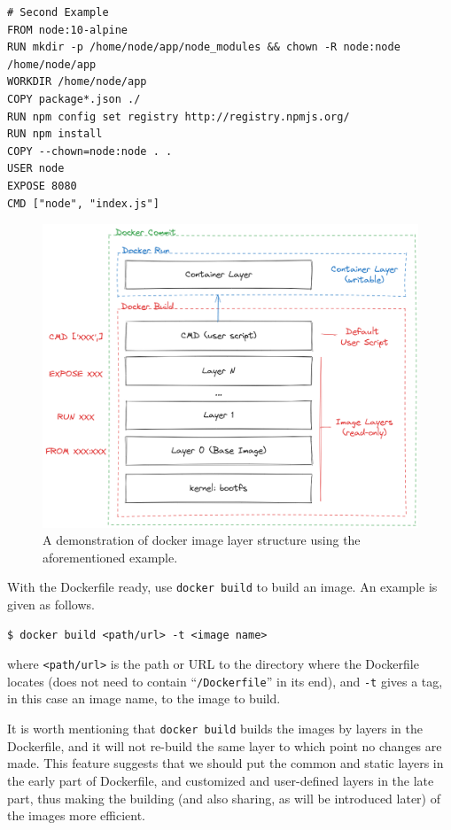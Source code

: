 \begin{lstlisting}
# Second Example
FROM node:10-alpine
RUN mkdir -p /home/node/app/node_modules && chown -R node:node /home/node/app
WORKDIR /home/node/app
COPY package*.json ./
RUN npm config set registry http://registry.npmjs.org/
RUN npm install
COPY --chown=node:node . .
USER node
EXPOSE 8080
CMD ["node", "index.js"]
\end{lstlisting}

\begin{figure}[!htb]
	\centering
	\includegraphics[width=350pt]{chapters/part-3/figures/dockerlayerdemo.png}
	\caption{A demonstration of docker image layer structure using the aforementioned example.} \label{ch:vac:fig:dockerlayerdemo}
\end{figure}

With the Dockerfile ready, use \verb|docker build| to build an image. An example is given as follows.
\begin{lstlisting}
$ docker build <path/url> -t <image name>
\end{lstlisting}
where \verb|<path/url>| is the path or URL to the directory where the Dockerfile locates (does not need to contain ``\verb|/Dockerfile|'' in its end), and \verb|-t| gives a tag, in this case an image name, to the image to build.

It is worth mentioning that \verb|docker build| builds the images by layers in the Dockerfile, and it will not re-build the same layer to which point no changes are made. This feature suggests that we should put the common and static layers in the early part of Dockerfile, and customized and user-defined layers in the late part, thus making the building (and also sharing, as will be introduced later) of the images more efficient. 

